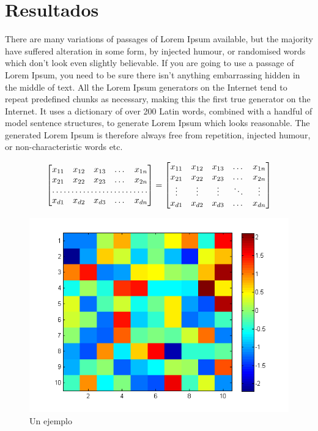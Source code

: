 \documentclass[11pt, spanish]{article}
\begin{document}
\section{Resultados}

There are many variations of passages of Lorem Ipsum available, but the majority have suffered alteration in some form, by injected humour, or randomised words which don't look even slightly believable. If you are going to use a passage of Lorem Ipsum, you need to be sure there isn't anything embarrassing hidden in the middle of text. All the Lorem Ipsum generators on the Internet tend to repeat predefined chunks as necessary, making this the first true generator on the Internet. It uses a dictionary of over 200 Latin words, combined with a handful of model sentence structures, to generate Lorem Ipsum which looks reasonable. The generated Lorem Ipsum is therefore always free from repetition, injected humour, or non-characteristic words etc.


\[
\begin{bmatrix}
    x_{11}       & x_{12} & x_{13} & \dots & x_{1n} \\
    x_{21}       & x_{22} & x_{23} & \dots & x_{2n} \\
    \hdotsfor{5} \\
    x_{d1}       & x_{d2} & x_{d3} & \dots & x_{dn}
\end{bmatrix}
=
\begin{bmatrix}
    x_{11} & x_{12} & x_{13} & \dots  & x_{1n} \\
    x_{21} & x_{22} & x_{23} & \dots  & x_{2n} \\
    \vdots & \vdots & \vdots & \ddots & \vdots \\
    x_{d1} & x_{d2} & x_{d3} & \dots  & x_{dn}
\end{bmatrix}
\]

\begin{figure}[htbp]
\centering
	\includegraphics[scale=0.8]{data/img/plot2}
	\caption{Un ejemplo}
\end{figure}
\end{document}
